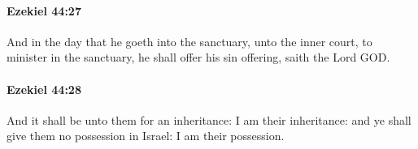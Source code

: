 		\paragraph{Ezekiel 44:27} %
			\label{EZEKIEL-44-27}

			And in the day that he goeth into the sanctuary, unto the inner court, to minister in the sanctuary, he shall offer his sin offering, saith the Lord GOD.


		\paragraph{Ezekiel 44:28} %
			\label{EZEKIEL-44-28}

			And it shall be unto them for an inheritance: I am their inheritance: and ye shall give them no possession in Israel: I am their possession.


